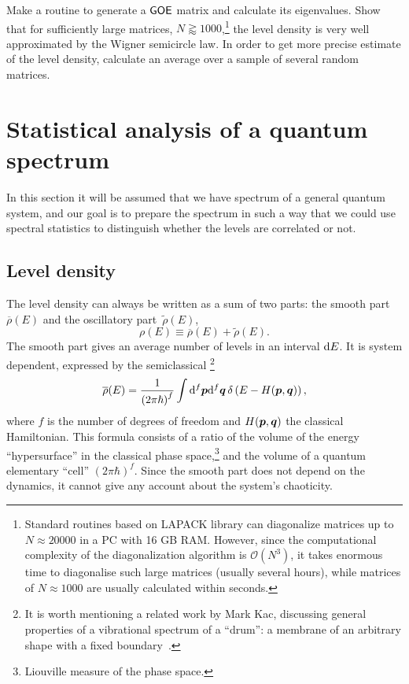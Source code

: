 \documentclass[a4paper,11pt,twoside]{article}
\begin{document}
    \begin{task}\label{task:GOE}
        Make a routine to generate a $\mathsf{GOE}$ matrix and calculate its eigenvalues.
        Show that for sufficiently large matrices, $N\gtrapprox1000$,\footnote{
            Standard routines based on LAPACK library can diagonalize matrices up to $N\approx20000$ in a PC with 16 GB RAM.
            However, since the computational complexity of the diagonalization algorithm is $\mathcal{O}(N^{3})$, it takes enormous time to diagonalise such large matrices (usually several hours), while matrices of $N\approx1000$ are usually calculated within seconds.
        }
        the level density is very well approximated by the Wigner semicircle law.
        In order to get more precise estimate of the level density, calculate an average over a sample of several random matrices.
    \end{task}

\section{Statistical analysis of a quantum spectrum}
    In this section it will be assumed that we have spectrum of a general quantum system, and our goal is to prepare the spectrum in such a way that we could use spectral statistics to distinguish whether the levels are correlated or not.

    \subsection{Level density}
        The level density can always be written as a sum of two parts: the smooth part $\overline{\rho}(E)$ and the oscillatory part~$\tilde{\rho}(E)$,
        \begin{equation}
            \rho(E)\equiv\overline{\rho}(E)+\tilde{\rho}(E).
        \end{equation}  
        The smooth part gives an average number of levels in an interval $\mathrm{d} E$.        
        It is system dependent, expressed by the semiclassical \footnote{
            It is worth mentioning a related work by Mark Kac, discussing general properties of a vibrational spectrum of a ``drum'': a membrane of an arbitrary shape with a fixed boundary~\cite{Kac66}.
        }
        \begin{equation}
            \label{eq:Smooth}
            \overline{\rho}(E)=\frac{1}{\left(2\pi\hbar\right)^{f}}\int\mathrm{d}^{f}\boldsymbol{p}\mathrm{d}^{f}\boldsymbol{q}\,\delta\left(E-H(\boldsymbol{p},\boldsymbol{q})\right),
        \end{equation}
        where $f$ is the number of degrees of freedom and $H(\boldsymbol{p},\boldsymbol{q})$ the classical Hamiltonian.
        This formula consists of a ratio of the volume of the energy ``hypersurface'' in the classical phase space,\footnote{
            Liouville measure of the phase space.
        } and the volume of a quantum elementary ``cell'' $(2\pi\hbar)^{f}$.
        Since the smooth part does not depend on the dynamics, it cannot give any account about the system's chaoticity.
\end{document}
